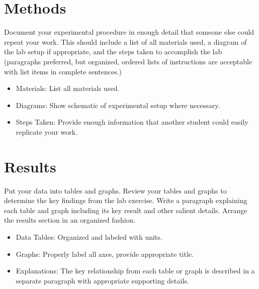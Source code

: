 \documentclass[
    10pt,aps,prl,
    amsfonts,
    amssymb,
    amsmath,
    draft,
    runinaddress,
    secnum,
    showkeys,
    superscriptaddress,
    twocolumn,
]{revtex4}
\begin{document}
\section{Methods}
    \label{sec:methods}

    Document your experimental procedure in enough detail that someone
        else could repeat your work. 
    This should include a list of all materials used, a diagram of the
        lab setup if appropriate, and the steps taken to accomplish the
        lab (paragraphs preferred, but organized, ordered lists of
        instructions are acceptable with list items in complete sentences.)

    \begin{itemize}
        \item Materials: List all materials used.
        \item Diagrams: Show schematic of experimental setup where necessary.
        \item Steps Taken: Provide enough information that another student
                could easily replicate your work.
    \end{itemize}


\section{Results}
    \label{sec:results}

    Put your data into tables and graphs. 
    Review your tables and graphs to determine the key findings from the
        lab exercise. 
    Write a paragraph explaining each table and graph including its key
        result and other salient details.
    Arrange the results section in an organized fashion.
    \begin{itemize}
        \item Data Tables: Organized and labeled with units.
        \item Graphs: Properly label all axes, provide appropriate title.
        \item Explanations: The key relationship from each table or graph
                 is described in a separate paragraph with appropriate 
                 supporting details.
    \end{itemize}
\end{document}
